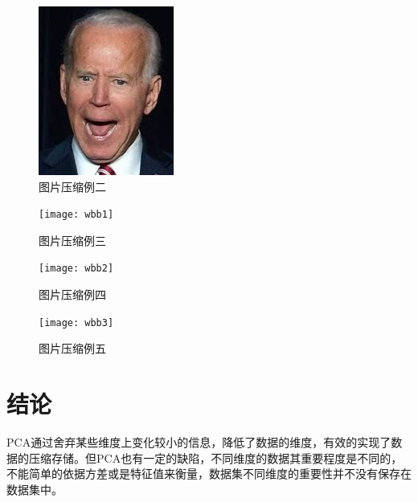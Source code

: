 \documentclass[withoutpreface,bwprint]{cumcmthesis}
\begin{document}
\begin{figure}[H]
    \centering
    \includegraphics[width=\textwidth]{biden}
    \caption{图片压缩例二}
    \label{图5}
\end{figure}
\begin{figure}[H]
    \centering
    \texttt{[image: wbb1]}
    \caption{图片压缩例三}
    \label{图6}
\end{figure}
\begin{figure}[H]
    \centering
    \texttt{[image: wbb2]}
    \caption{图片压缩例四}
    \label{图7}
\end{figure}
\begin{figure}[H]
    \centering
    \texttt{[image: wbb3]}
    \caption{图片压缩例五}
    \label{图8}
\end{figure}
\section{结论}
PCA通过舍弃某些维度上变化较小的信息，降低了数据的维度，有效的实现了数据的压缩存储。但PCA也有一定的缺陷，不同维度的数据其重要程度是不同的，不能简单的依据方差或是特征值来衡量，数据集不同维度的重要性并不没有保存在数据集中。
\end{document}
